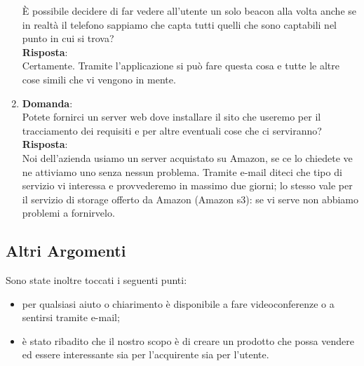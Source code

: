 \documentclass[a4paper,titlepage]{article}
\begin{document}
\begin{enumerate}
  È possibile decidere di far vedere all'utente un solo beacon alla volta anche se in realtà il telefono sappiamo che capta tutti quelli che sono captabili nel punto in cui si trova?\\
  \textbf{Risposta}: \\ 
  Certamente. Tramite l'applicazione si può fare questa cosa e tutte le altre cose simili che vi vengono in mente.
  \item \textbf{Domanda}:\\
  Potete fornirci un server web dove installare il sito che useremo per il tracciamento dei requisiti e per altre eventuali cose che ci serviranno?\\
  \textbf{Risposta}: \\
  Noi dell'azienda usiamo un server acquistato su Amazon, se ce lo chiedete ve ne attiviamo uno senza nessun problema. Tramite e-mail diteci che tipo di servizio vi interessa e provvederemo in massimo due giorni; lo stesso vale per il servizio di storage offerto da Amazon (Amazon s3): se vi serve non abbiamo problemi a fornirvelo.
\end{enumerate}

\subsection{Altri Argomenti}
\label{sub:AltriArgomenti}

Sono state inoltre toccati i seguenti punti:

\begin{itemize}
  \item per qualsiasi aiuto o chiarimento \PROPONENTE {} è disponibile a fare videoconferenze o a sentirsi tramite e-mail;
  \item è stato ribadito che il nostro scopo è di creare un prodotto che possa vendere ed essere interessante sia per l'acquirente sia per l'utente.
\end{itemize}
\end{document}
